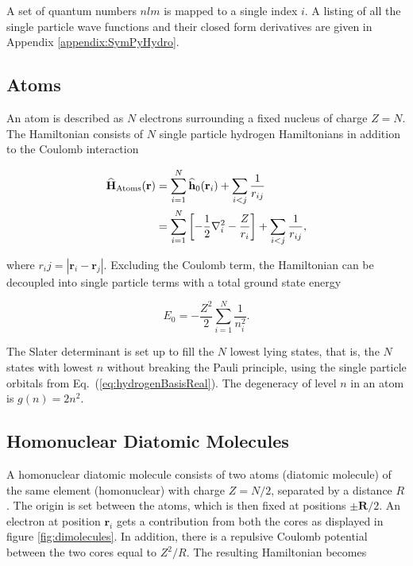 A set of quantum numbers $nlm$ is mapped to a single index $i$. A listing of all the single particle wave functions and their closed form derivatives are given in Appendix \ref{appendix:SymPyHydro}.

\subsection{Atoms}

An atom is described as $N$ electrons surrounding a fixed nucleus of charge $Z=N$. The Hamiltonian consists of $N$ single particle hydrogen Hamiltonians in addition to the Coulomb interaction

\begin{align}
 {\bf\widehat{H}}_{\mathrm{Atoms}}(\mathbf{r}) &= \sum_{i=1}^N {\bf\widehat{h}}_0(\mathbf{r}_i) + \sum_{i<j} \frac{1}{r_{ij}} \\
                         &= \sum_{i=1}^N \left[-\frac{1}{2}\nabla_i^2 - \frac{Z}{r_i}\right] + \sum_{i<j} \frac{1}{r_{ij}},
\end{align}

where $r_ij = |\mathbf{r}_i -\mathbf{r}_j|$. Excluding the Coulomb term, the Hamiltonian can be decoupled into single particle terms with a total ground state energy

\begin{equation}
 E_0 = -\frac{Z^2}{2}\sum_{i=1}^N \frac{1}{n_i^2}.
\end{equation}

The Slater determinant is set up to fill the $N$ lowest lying states, that is, the $N$ states with lowest $n$ without breaking the Pauli principle, using the single particle orbitals from Eq.~(\ref{eq:hydrogenBasisReal}). The degeneracy of level $n$ in an atom is $g(n) = 2n^2$.

\subsection{Homonuclear Diatomic Molecules}

A homonuclear diatomic molecule consists of two atoms (diatomic molecule) of the same element (homonuclear) with charge $Z=N/2$, separated by a distance $R$. The origin is set between the atoms, which is then fixed at positions $\pm \mathbf{R}/2$. An electron at position $\mathbf{r}_i$ gets a contribution from both the cores as displayed in figure \ref{fig:dimolecules}. In addition, there is a repulsive Coulomb potential between the two cores equal to $Z^2/R$. The resulting Hamiltonian becomes

